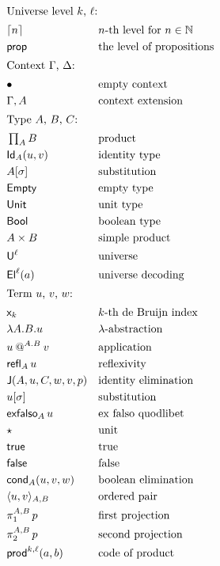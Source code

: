 
\begin{align*}
%
\intertext{Universe level $k$, $\ell$:}
  & \univ{n} && \text{$n$-th level for $n \in \mathbb{N}$} \\
  & \propLevel && \text{the level of propositions} \\
\intertext{Context $\Gamma$, $\Delta$:}
  & \ctxempty &&\text{empty context} \\
  & \ctxextend{\Gamma}{A} &&\text{context extension} \\
%
\intertext{Type $A$, $B$, $C$:}
  & \Prod{A}{B} &&\text{product} \\
  & \Id{A}{u}{v} &&\text{identity type} \\
  & \Subst{A}{\sigma} &&\text{substitution} \\
  & \Empty &&\text{empty type} \\
  & \Unit &&\text{unit type} \\
  & \Bool &&\text{boolean type} \\
  & \SimProd{A}{B} &&\text{simple product} \\
  & \Univ{\ell} &&\text{universe} \\
  & \El{\ell}{a} &&\text{universe decoding} \\
\intertext{Term $u$, $v$, $w$:}
 & \var{k} &&\text{$k$-th de Bruijn index} \\
 & \lam{A}{B}{u} &&\text{$\lambda$-abstraction} \\
 & \app{u}{A}{B}{v} &&\text{application} \\
 & \refl{A}{u} &&\text{reflexivity} \\
 & \J{A}{u}{C}{w}{v}{p} &&\text{identity elimination} \\
 & \subst{u}{\sigma} &&\text{substitution} \\
 & \exfalso{A}{u} &&\text{ex falso quodlibet} \\
 & \unit &&\text{unit} \\
 & \true &&\text{true} \\
 & \false &&\text{false} \\
 & \cond{A}{u}{v}{w} &&\text{boolean elimination} \\
 & \pair{A}{B}{u}{v} &&\text{ordered pair} \\
 & \projOne{A}{B}{p} &&\text{first projection} \\
 & \projTwo{A}{B}{p} &&\text{second projection} \\
 & \uniProd{k}{\ell}{a}{b} &&\text{code of product} \\

\end{align*}
